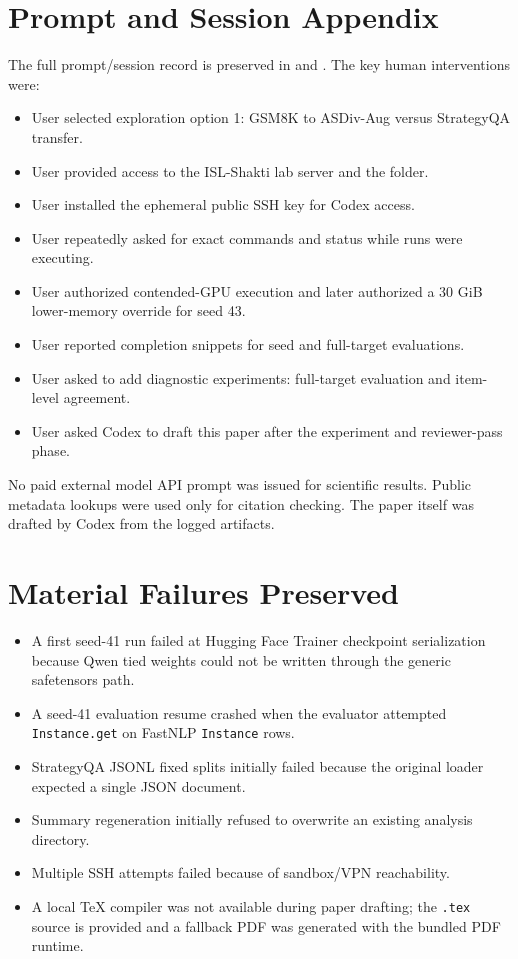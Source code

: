 \documentclass{article}
\begin{document}
\appendix

\section{Prompt and Session Appendix}

The full prompt/session record is preserved in  and . The key human interventions were:

\begin{itemize}
  \item User selected exploration option 1: GSM8K to ASDiv-Aug versus StrategyQA transfer.
  \item User provided access to the ISL-Shakti lab server and the  folder.
  \item User installed the ephemeral public SSH key for Codex access.
  \item User repeatedly asked for exact commands and status while runs were executing.
  \item User authorized contended-GPU execution and later authorized a 30 GiB lower-memory override for seed 43.
  \item User reported completion snippets for seed and full-target evaluations.
  \item User asked to add diagnostic experiments: full-target evaluation and item-level agreement.
  \item User asked Codex to draft this paper after the experiment and reviewer-pass phase.
\end{itemize}

No paid external model API prompt was issued for scientific results. Public metadata lookups were used only for citation checking. The paper itself was drafted by Codex from the logged artifacts.

\section{Material Failures Preserved}

\begin{itemize}
  \item A first seed-41 run failed at Hugging Face Trainer checkpoint serialization because Qwen tied weights could not be written through the generic safetensors path.
  \item A seed-41 evaluation resume crashed when the evaluator attempted \texttt{Instance.get} on FastNLP \texttt{Instance} rows.
  \item StrategyQA JSONL fixed splits initially failed because the original loader expected a single JSON document.
  \item Summary regeneration initially refused to overwrite an existing analysis directory.
  \item Multiple SSH attempts failed because of sandbox/VPN reachability.
  \item A local TeX compiler was not available during paper drafting; the \texttt{.tex} source is provided and a fallback PDF was generated with the bundled PDF runtime.
\end{itemize}
\end{document}
